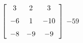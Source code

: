 {$\left[ \begin {array}{ccc} 3&2&3\\\noalign{\medskip}-6&1&-10
\\\noalign{\medskip}-8&-9&-9\end {array} \right]$} 
{$-59$}

  

 

